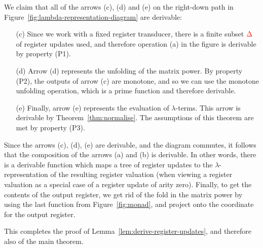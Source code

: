 \pagebreak 
We claim that all of the arrows (c), (d) and (e) on the  right-down path  in  Figure~\ref{fig:lambda-representation-diagram}  are derivable:
\begin{itemize}
    \item[(c)] Since we work with a fixed register transducer, there is a finite subset ${\color{red}{\Delta}}$ of register updates  used, and therefore  operation (a) in the figure is derivable by property (P1).
    \item[(d)] Arrow (d) represents the unfolding of the matrix power. By property (P2), the outputs of arrow (c) are monotone, and so we can use the monotone unfolding operation, which is a  prime function and therefore derivable. 
    \item[(e)] Finally, arrow (e) represents the evaluation of $\lambda$-terms. This arrow is derivable by Theorem~\ref{thm:normalise}. The assumptions of this theorem are met by property (P3).
\end{itemize}
Since the arrows (c), (d), (e) are derivable, and the diagram commutes, it follows that  the composition of the arrows (a) and (b) is derivable. In other words, there is a derivable function which maps a tree of register updates to the $\lambda$-representation of the resulting register valuation (when viewing a register valuation as a special case of a register update of arity zero). Finally, to get the contents of the output register, we get rid of the fold in the matrix power by using the last function from Figure~\ref{fig:monad}, and  project onto the coordinate for the output register. 



This completes the proof of Lemma~\ref{lem:derive-register-updates}, and therefore also of the main theorem. 




